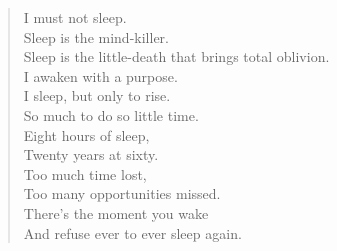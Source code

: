 \documentclass[11pt,letterpaper]{article}
\begin{document}
\begin{verse}
I must not sleep.\\
Sleep is the mind-killer.\\
Sleep is the little-death that brings total oblivion.\\

I awaken with a purpose.\\
I sleep, but only to rise.\\
So much to do so little time.\\
Eight hours of sleep,\\
Twenty years at sixty.\\
Too much time lost,\\
Too many opportunities missed.\\
There's the moment you wake\\
And refuse ever to ever sleep again.\\

\end{verse}

\end{document}
